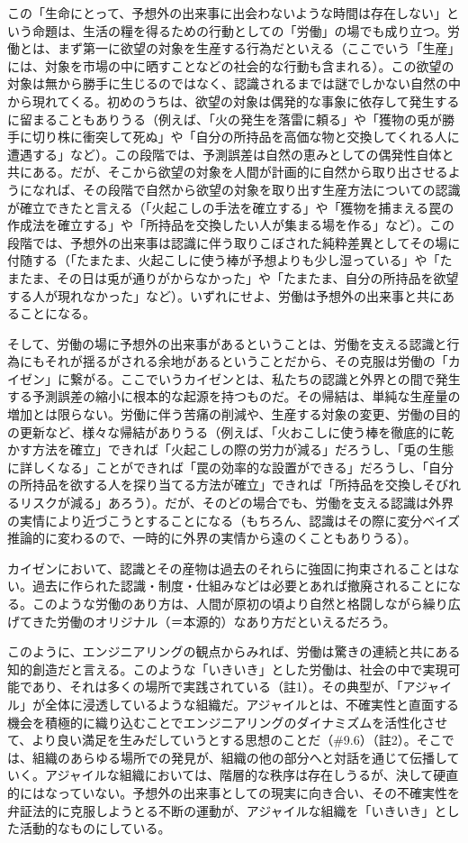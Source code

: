 この「生命にとって、予想外の出来事に出会わないような時間は存在しない」という命題は、生活の糧を得るための行動としての「労働」の場でも成り立つ。労働とは、まず第一に欲望の対象を生産する行為だといえる（ここでいう「生産」には、対象を市場の中に晒すことなどの社会的な行動も含まれる）。この欲望の対象は無から勝手に生じるのではなく、認識されるまでは謎でしかない自然の中から現れてくる。初めのうちは、欲望の対象は偶発的な事象に依存して発生するに留まることもありうる（例えば、「火の発生を落雷に頼る」や「獲物の兎が勝手に切り株に衝突して死ぬ」や「自分の所持品を高価な物と交換してくれる人に遭遇する」など）。この段階では、予測誤差は自然の恵みとしての偶発性自体と共にある。だが、そこから欲望の対象を人間が計画的に自然から取り出させるようになれば、その段階で自然から欲望の対象を取り出す生産方法についての認識が確立できたと言える（「火起こしの手法を確立する」や「獲物を捕まえる罠の作成法を確立する」や「所持品を交換したい人が集まる場を作る」など）。この段階では、予想外の出来事は認識に伴う取りこぼされた純粋差異としてその場に付随する（「たまたま、火起こしに使う棒が予想よりも少し湿っている」や「たまたま、その日は兎が通りがからなかった」や「たまたま、自分の所持品を欲望する人が現れなかった」など）。いずれにせよ、労働は予想外の出来事と共にあることになる。

そして、労働の場に予想外の出来事があるということは、労働を支える認識と行為にもそれが揺るがされる余地があるということだから、その克服は労働の「カイゼン」に繋がる。ここでいうカイゼンとは、私たちの認識と外界との間で発生する予測誤差の縮小に根本的な起源を持つものだ。その帰結は、単純な生産量の増加とは限らない。労働に伴う苦痛の削減や、生産する対象の変更、労働の目的の更新など、様々な帰結がありうる（例えば、「火おこしに使う棒を徹底的に乾かす方法を確立」できれば「火起こしの際の労力が減る」だろうし、「兎の生態に詳しくなる」ことができれば「罠の効率的な設置ができる」だろうし、「自分の所持品を欲する人を探り当てる方法が確立」できれば「所持品を交換しそびれるリスクが減る」あろう）。だが、そのどの場合でも、労働を支える認識は外界の実情により近づこうとすることになる（もちろん、認識はその際に変分ベイズ推論的に変わるので、一時的に外界の実情から遠のくこともありうる）。

カイゼンにおいて、認識とその産物は過去のそれらに強固に拘束されることはない。過去に作られた認識・制度・仕組みなどは必要とあれば撤廃されることになる。このような労働のあり方は、人間が原初の頃より自然と格闘しながら繰り広げてきた労働のオリジナル（＝本源的）なあり方だといえるだろう。

このように、エンジニアリングの観点からみれば、労働は驚きの連続と共にある知的創造だと言える。このような「いきいき」とした労働は、社会の中で実現可能であり、それは多くの場所で実践されている（註1）。その典型が、「アジャイル」が全体に浸透しているような組織だ。アジャイルとは、不確実性と直面する機会を積極的に織り込むことでエンジニアリングのダイナミズムを活性化させて、より良い満足を生みだしていうとする思想のことだ（\#9.6）（註2）。そこでは、組織のあらゆる場所での発見が、組織の他の部分へと対話を通じて伝播していく。アジャイルな組織においては、階層的な秩序は存在しうるが、決して硬直的にはなっていない。予想外の出来事としての現実に向き合い、その不確実性を弁証法的に克服しようとる不断の運動が、アジャイルな組織を「いきいき」とした活動的なものにしている。

